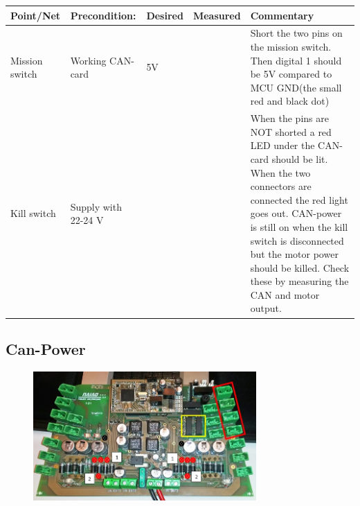 \begin{table}[ht]
\begin{tabularx}{\textwidth}{|>{\hsize=0.6\hsize}X|>{\hsize=0.8\hsize}X|>{\hsize=0.8\hsize}X|c|>{\hsize=1.8\hsize}X|}
\hline
Point/Net & Precondition: & Desired & Measured & Commentary \\ 
\hline
Mission switch & Working CAN-card & 5V &   & Short the two pins on the mission switch. Then digital 1 should be 5V compared to MCU GND(the small red and black dot) \\ 
\hline 
Kill switch & Supply with 22-24 V &  &  & When the pins are NOT shorted a red LED under the CAN-card should be lit. When the two connectors are connected the red light goes out. CAN-power is still on when the kill switch is disconnected but the motor power should be killed. Check these by measuring the CAN and motor output. \\ 
\hline 
\end{tabularx}
\end{table}

\newpage
\subsection{Can-Power}
\begin{figure}[!ht]
	\begin{center}
		\includegraphics[width=0.76\textwidth]{./Images/Unit_test_power_board/can_pwr.jpg}
		\label{can_pwr}
	\end{center}
\end{figure}

